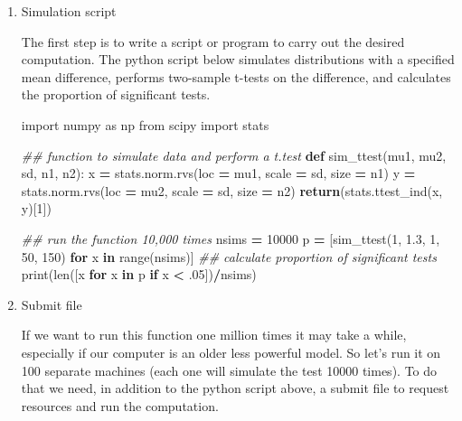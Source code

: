 \documentclass[]{book}
\newenvironment{Shaded}{\begin{snugshade}}{\end{snugshade}}
\newcommand{\KeywordTok}[1]{\textcolor[rgb]{0.13,0.29,0.53}{\textbf{#1}}}
\newcommand{\DecValTok}[1]{\textcolor[rgb]{0.00,0.00,0.81}{#1}}
\newcommand{\FloatTok}[1]{\textcolor[rgb]{0.00,0.00,0.81}{#1}}
\newcommand{\ImportTok}[1]{#1}
\newcommand{\CommentTok}[1]{\textcolor[rgb]{0.56,0.35,0.01}{\textit{#1}}}
\newcommand{\ControlFlowTok}[1]{\textcolor[rgb]{0.13,0.29,0.53}{\textbf{#1}}}
\newcommand{\OperatorTok}[1]{\textcolor[rgb]{0.81,0.36,0.00}{\textbf{#1}}}
\newcommand{\BuiltInTok}[1]{#1}
\newcommand{\NormalTok}[1]{#1}
\begin{document}
\begin{enumerate}
\def\labelenumi{\arabic{enumi}.}
\item
  Simulation script

  The first step is to write a script or program to carry out the
  desired computation. The python script below simulates distributions
  with a specified mean difference, performs two-sample t-tests on the
  difference, and calculates the proportion of significant tests.

\begin{Shaded}
\begin{Highlighting}[]
\ImportTok{import}\NormalTok{ numpy }\ImportTok{as}\NormalTok{ np}
\ImportTok{from}\NormalTok{ scipy }\ImportTok{import}\NormalTok{ stats}

\CommentTok{## function to simulate data and perform a t.test}
\KeywordTok{def}\NormalTok{ sim_ttest(mu1, mu2, sd, n1, n2):}
\NormalTok{    x }\OperatorTok{=}\NormalTok{ stats.norm.rvs(loc }\OperatorTok{=}\NormalTok{ mu1, scale }\OperatorTok{=}\NormalTok{ sd, size }\OperatorTok{=}\NormalTok{ n1)}
\NormalTok{    y }\OperatorTok{=}\NormalTok{ stats.norm.rvs(loc }\OperatorTok{=}\NormalTok{ mu2, scale }\OperatorTok{=}\NormalTok{ sd, size }\OperatorTok{=}\NormalTok{ n2)}
    \ControlFlowTok{return}\NormalTok{(stats.ttest_ind(x, y)[}\DecValTok{1}\NormalTok{])}

\CommentTok{##  run the function 10,000 times}
\NormalTok{nsims }\OperatorTok{=} \DecValTok{10000}
\NormalTok{p }\OperatorTok{=}\NormalTok{ [sim_ttest(}\DecValTok{1}\NormalTok{, }\FloatTok{1.3}\NormalTok{, }\DecValTok{1}\NormalTok{, }\DecValTok{50}\NormalTok{, }\DecValTok{150}\NormalTok{)  }\ControlFlowTok{for}\NormalTok{ x }\KeywordTok{in} \BuiltInTok{range}\NormalTok{(nsims)]}
\CommentTok{## calculate proportion of significant tests}
\BuiltInTok{print}\NormalTok{(}\BuiltInTok{len}\NormalTok{([x }\ControlFlowTok{for}\NormalTok{ x }\KeywordTok{in}\NormalTok{ p }\ControlFlowTok{if}\NormalTok{ x }\OperatorTok{<}\NormalTok{ .}\DecValTok{05}\NormalTok{])}\OperatorTok{/}\NormalTok{nsims)}
\end{Highlighting}
\end{Shaded}
\item
  Submit file

  If we want to run this function one million times it may take a while,
  especially if our computer is an older less powerful model. So let's
  run it on 100 separate machines (each one will simulate the test 10000
  times). To do that we need, in addition to the python script above, a
  submit file to request resources and run the computation.


\end{enumerate}
\end{document}
